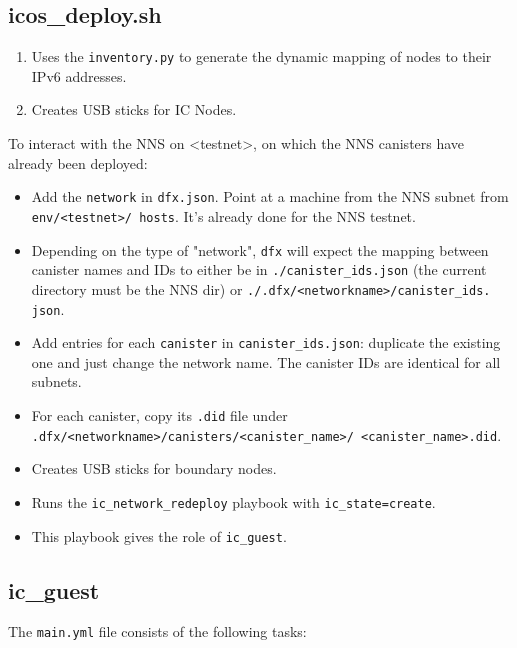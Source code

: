 \subsection{icos\_deploy.sh}

\begin{enumerate}
    \item Uses the \texttt{inventory.py} to generate the dynamic mapping of nodes to their IPv6 addresses.
    \item Creates USB sticks for IC Nodes.
\end{enumerate}

To interact with the NNS on <testnet>, on which the NNS canisters have already been deployed:
\begin{itemize}
    \item Add the \texttt{network} in \texttt{dfx.json}. Point at a machine from the NNS subnet from \texttt{env/<testnet>/
    hosts}. It's already done for the NNS testnet.
    \item Depending on the type of "network", \texttt{dfx} will expect the mapping between canister names and IDs to either be 
    in \texttt{./canister\_ids.json} (the current directory must be the NNS dir) or \texttt{./.dfx/<networkname>/canister\_ids.
    json}.
    \item Add entries for each \texttt{canister} in \texttt{canister\_ids.json}: duplicate the existing one and just change the 
    network name. The canister IDs are identical for all subnets.
    \item For each canister, copy its \texttt{.did} file under 
    \texttt{.dfx/<networkname>/canisters/<canister\_name>/  <canister\_name>.did}.
    \item Creates USB sticks for boundary nodes.
    \item Runs the \texttt{ic\_network\_redeploy} playbook with \texttt{ic\_state=create}.
    \item This playbook gives the role of \texttt{ic\_guest}.
\end{itemize}

\subsection{ic\_guest}

The \texttt{main.yml} file consists of the following tasks:

